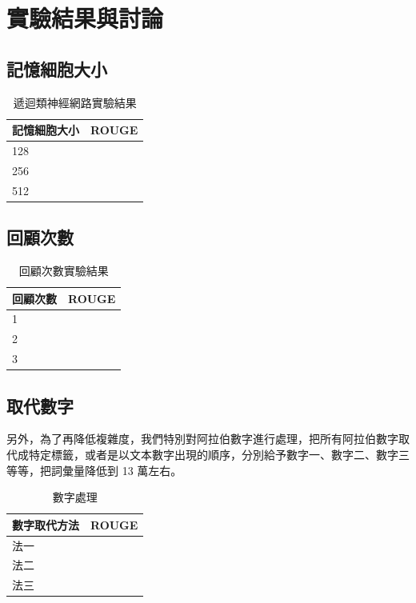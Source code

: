 \section{實驗結果與討論}
\subsection{記憶細胞大小}
\begin{table}
    \caption{遞迴類神經網路實驗結果}
    \label{table:RNNCell_size}
    \centering
    \begin{tabular}{|l|l|}
        \hline
        記憶細胞大小 & ROUGE\\
        \hline
        128 & \\
        \hline
        256 & \\
        \hline
        512 & \\
        \hline
    \end{tabular}
\end{table}
\subsection{回顧次數}
\begin{table}
    \caption{回顧次數實驗結果}
    \label{table:hop}
    \centering
    \begin{tabular}{|l|l|}
        \hline
        回顧次數 & ROUGE\\
        \hline
        1 & \\
        \hline
        2 & \\
        \hline
        3 & \\
        \hline
    \end{tabular}
\end{table}
\subsection{取代數字}
另外，為了再降低複雜度，我們特別對阿拉伯數字進行處理，把所有阿拉伯數字取代成特定標籤，或者是以文本數字出現的順序，分別給予數字一、數字二、數字三等等，把詞彙量降低到 13 萬左右。
\begin{table}
    \caption{數字處理}
    \label{table:digit}
    \centering
    \begin{tabular}{|l|l|}
        \hline
        數字取代方法 & ROUGE\\
        \hline
        法一 & \\
        \hline
        法二 & \\
        \hline
        法三 & \\
        \hline
    \end{tabular}
\end{table}
